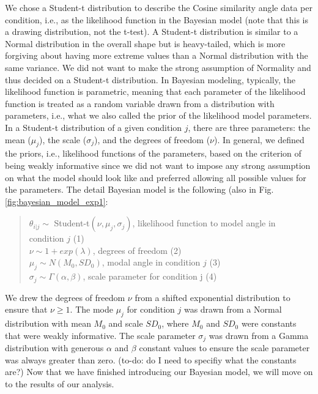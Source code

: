We chose a Student-t distribution to describe the Cosine similarity angle data per condition, i.e., as the likelihood function in the Bayesian model (note that this is a drawing distribution, not the t-test). A Student-t distribution is similar to a Normal distribution in the overall shape but is heavy-tailed, which is more forgiving about having more extreme values than a Normal distribution with the same variance. We did not want to make the strong assumption of Normality and thus decided on a Student-t distribution. In Bayesian modeling, typically, the likelihood function is parametric, meaning that each parameter of the likelihood function is treated as a random variable drawn from a distribution with parameters, i.e., what we also called the prior of the likelihood model parameters. In a Student-t distribution of a given condition $j$, there are three parameters: the mean ($\mu_j$), the scale ($\sigma_j$), and the degrees of freedom ($\nu$). In general, we defined the priors, i.e., likelihood functions of the parameters, based on the criterion of being weakly informative since we did not want to impose any strong assumption on what the model should look like and preferred allowing all possible values for the parameters. The detail Bayesian model is the following (also in Fig. \ref{fig:bayesian_model_exp1}:

\begin{quote}
    $\theta_{i|j} \sim$ Student-t$(\nu, \mu_j, \sigma_j)$, \hfill likelihood function to model angle in condition $j$ (1) \\
    $\nu \sim 1 + exp(\lambda)$, \hfill degrees of freedom (2) \\
    $\mu_j \sim N(M_0, SD_0)$, \hfill modal angle in condition $j$ (3) \\
    $\sigma_j \sim \Gamma(\alpha, \beta)$, \hfill scale parameter for condition j (4)
\end{quote}

We drew the degrees of freedom $\nu$ from a shifted exponential distribution to ensure that $\nu \geq 1$. The mode $\mu_j$ for condition $j$ was drawn from a Normal distribution with mean $M_0$ and scale $SD_0$, where $M_0$ and $SD_0$ were constants that were weakly informative. The scale parameter $\sigma_j$ was drawn from a Gamma distribution with generous $\alpha$ and $\beta$ constant values to ensure the scale parameter was always greater than zero. (to-do: do I need to specifiy what the constants are?) Now that we have finished introducing our Bayesian model, we will move on to the results of our analysis.

